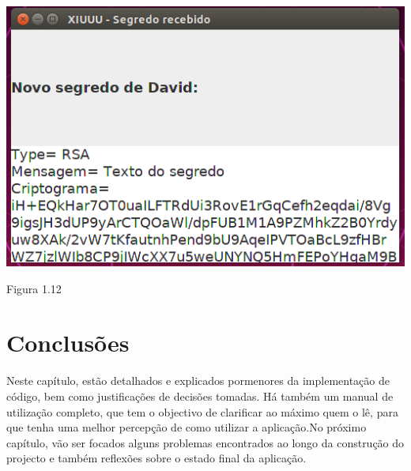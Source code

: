 \newline\begin{center}\includegraphics[scale=0.5]{img/receivedSecret.png}\newline\caption{Figura 1.12}\end{center}


\section{Conclusões}
\label{chap4:sec:concs}
Neste capítulo, estão detalhados e explicados pormenores da implementação de código, bem como justificações de decisões tomadas. Há também um manual de utilização completo, que tem o objectivo de clarificar ao máximo quem o lê, para que tenha uma melhor percepção de como utilizar a aplicação.No próximo capítulo, vão ser focados alguns problemas encontrados ao longo da construção do projecto e também reflexões sobre o estado final da aplicação.